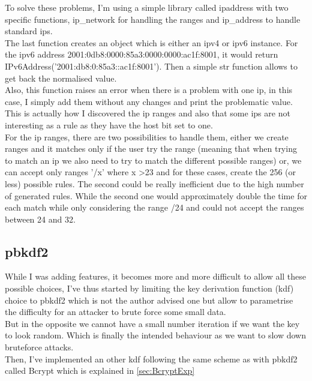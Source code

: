 \documentclass{eplmastersthesis}
\begin{document}
To solve these problems, I'm using a simple library called ipaddress with two specific functions, ip\_network for handling the ranges and ip\_address to handle standard \gls{ip}s.\\
The last function creates an object which is either an \gls{ipv4} or \gls{ipv6} instance. For the \gls{ipv6} address 2001:0db8:0000:85a3:0000:0000:ac1f:8001, it would return IPv6Address('2001:db8:0:85a3::ac1f:8001'). Then a simple str function allows to get back the normalised value.\\
Also, this function raises  an error when there is a problem with one \gls{ip}, in this case, I simply add them without any changes and print the problematic value.\\
This is actually how I discovered the \gls{ip} ranges and also that some \gls{ip}s are not interesting as a rule as they have the host bit set to one.\\

For the \gls{ip} ranges, there are two possibilities to handle them, either we create ranges and it matches only if the user try the range (meaning that when trying to match an \gls{ip} we also need to try to match the different possible ranges) or, we can accept only ranges '/x' where x >23 and for these cases, create the 256 (or less) possible rules.
The second could be really inefficient due to the high number of generated rules. While the second one would approximately double the time for each match while only considering the range /24 and could not accept the ranges between 24 and 32.


\subsection{\gls{pbkdf2}}
While I was adding features, it becomes more and more difficult to allow all these possible choices, I've thus started by limiting the key derivation function (\gls{kdf}) choice to \gls{pbkdf2} which is not the author advised one but allow to parametrise the difficulty for an attacker to brute force some small data.\\
But in the opposite we cannot have a small number iteration if we want the key to look random. Which is finally the intended behaviour as we want to slow down bruteforce attacks.\\
Then, I've implemented an other \gls{kdf} following the same scheme as with \gls{pbkdf2} called Bcrypt which is explained in \ref{sec:BcryptExp}
\end{document}
